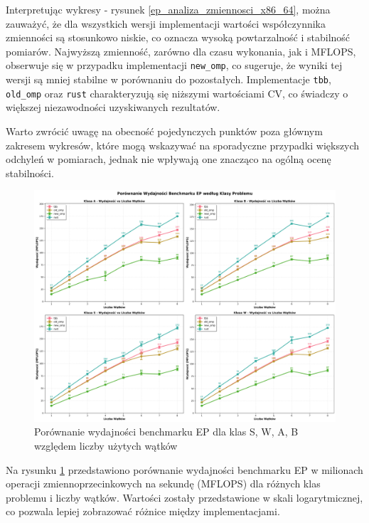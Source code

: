 Interpretując wykresy - rysunek \ref{ep_analiza_zmiennosci_x86_64}, można zauważyć, że dla wszystkich wersji implementacji wartości współczynnika zmienności są stosunkowo niskie, co oznacza wysoką powtarzalność i stabilność pomiarów. Najwyższą zmienność, zarówno dla czasu wykonania, jak i MFLOPS, obserwuje się w przypadku implementacji \texttt{new\_omp}, co sugeruje, że wyniki tej wersji są mniej stabilne w porównaniu do pozostałych. Implementacje \texttt{tbb}, \texttt{old\_omp} oraz \texttt{rust} charakteryzują się niższymi wartościami CV, co świadczy o większej niezawodności uzyskiwanych rezultatów.

Warto zwrócić uwagę na obecność pojedynczych punktów poza głównym zakresem wykresów, które mogą wskazywać na sporadyczne przypadki większych odchyleń w pomiarach, jednak nie wpływają one znacząco na ogólną ocenę stabilności.

\begin{figure}[H]
    \centering
    \includegraphics[width=\textwidth]{analiza/images/parallel/ep/x86/ep_porownanie_wydajnosci.png}
    \caption{Porównanie wydajności benchmarku EP dla klas S, W, A, B względem liczby użytych wątków}
    \label{ep_porownanie_wydajnosci_x86_64}
\end{figure}
Na rysunku \ref{ep_porownanie_wydajnosci_x86_64} przedstawiono porównanie wydajności benchmarku EP w milionach operacji zmiennoprzecinkowych na sekundę (MFLOPS) dla różnych klas problemu i liczby wątków. Wartości zostały przedstawione w skali logarytmicznej, co pozwala lepiej zobrazować różnice między implementacjami.

